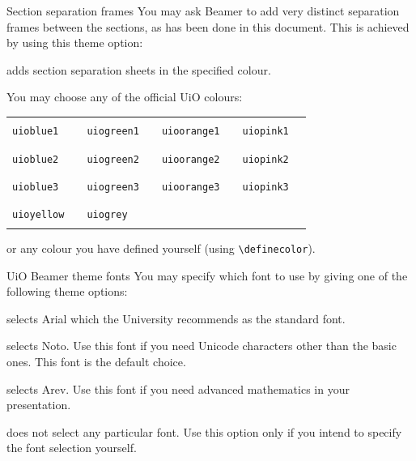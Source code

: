 \documentclass[UKenglish,aspectratio=169]{beamer}
\newcommand{\p}[1]{\texttt{#1}}
\newcommand{\pb}[1]{\textbf{\p{#1}}}
\newcommand{\pcmd}[1]{\p{\textbackslash #1}}
\begin{document}
\newcommand{\colordemo}[1]{\small \p{#1}& \color{#1}\rule{2em}{1ex}}

\begin{frame}{Section separation frames}
  You may ask Beamer to add very distinct separation frames between
  the sections, as has been done in this document. This is achieved by
  using this theme option:
  \begin{description}[\pb{toc}]
  \item[\pb{sectionsep=\emph{colour}}] adds section separation sheets
    in the specified colour. 
  \end{description}
  
  \smallskip
  You may choose any of the official UiO colours:
  
  \begin{tabular}{@{}lclclclc@{}}
    \colordemo{uioblue1}& \colordemo{uiogreen1}&
    \colordemo{uioorange1}& \colordemo{uiopink1}\\
    \colordemo{uioblue2}& \colordemo{uiogreen2}&
    \colordemo{uioorange2}& \colordemo{uiopink2}\\
    \colordemo{uioblue3}& \colordemo{uiogreen3}&
    \colordemo{uioorange3}& \colordemo{uiopink3}\\
    \colordemo{uioyellow}& \colordemo{uiogrey}\\
  \end{tabular}

  \medskip
  or any colour you have defined yourself (using \pcmd{definecolor}).
\end{frame}

\begin{frame}[label=fonts]{UiO Beamer theme fonts}
  You may specify which font to use by giving one of the following
  theme options:

  \begin{description}[\pb{font=arial}]
  \item[\pb{font=arial}] selects Arial which the University recommends
    as the standard font.

  \item[\pb{font=noto}] selects Noto. Use this font if you need
    Unicode characters other than the basic ones. This font is the
    default choice.

  \item[\pb{font=arev}] selects Arev. Use this font if you need advanced
    mathematics in your presentation.

  \item[\pb{font=none}] does not select any particular font. Use this
    option only if you intend to specify the font selection yourself.
  \end{description}
\end{frame}
\end{document}
